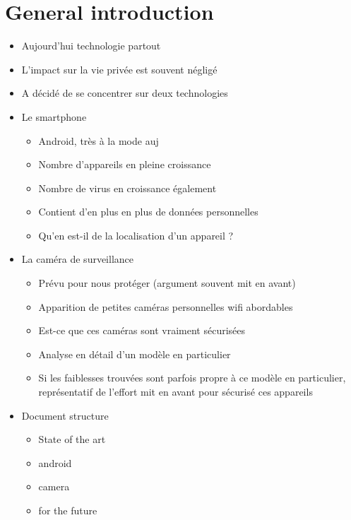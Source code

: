 \chapter*{General introduction}

\begin{itemize}
\item Aujourd'hui technologie partout
\item L'impact sur la vie privée est souvent négligé
\item A décidé de se concentrer sur deux technologies
\item Le smartphone
  \begin{itemize}
  \item Android, très à la mode auj
  \item Nombre d'appareils en pleine croissance
  \item Nombre de virus en croissance également
  \item Contient d'en plus en plus de données personnelles
  \item Qu'en est-il de la localisation d'un appareil ?
  \end{itemize}
\item La caméra de surveillance
  \begin{itemize}
  \item Prévu pour nous protéger (argument souvent mit en avant)
  \item Apparition de petites caméras personnelles wifi abordables
  \item Est-ce que ces caméras sont vraiment sécurisées
  \item Analyse en détail d'un modèle en particulier
  \item Si les faiblesses trouvées sont parfois propre à ce modèle en particulier, représentatif de l'effort mit en avant pour sécurisé ces appareils
  \end{itemize}
\item Document structure
  \begin{itemize}
  \item State of the art
  \item android
  \item camera
  \item for the future
  \end{itemize}
\end{itemize}